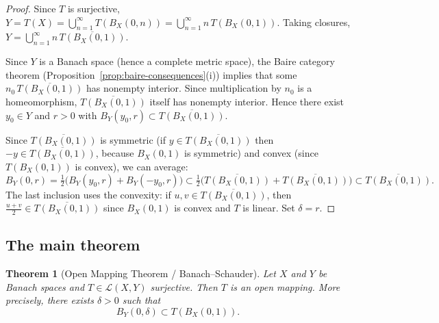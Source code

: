 \documentclass[a4paper,12pt]{book}
\theoremstyle{definition}
\theoremstyle{plain}
\newtheorem{theorem}[definition]{Theorem}
\theoremstyle{remark}
\begin{document}
\begin{proof}
Since $T$ is surjective, $Y = T(X) = \bigcup_{n=1}^{\infty} T(B_X(0,n))
= \bigcup_{n=1}^{\infty} n\, T(B_X(0,1))$. Taking closures,
$Y = \bigcup_{n=1}^{\infty} n\, \overline{T(B_X(0,1))}$.

Since $Y$ is a Banach space (hence a complete metric space), the Baire category
theorem (Proposition~\ref{prop:baire-consequences}(i)) implies that some
$n_0\, \overline{T(B_X(0,1))}$ has nonempty interior. Since multiplication by $n_0$
is a homeomorphism, $\overline{T(B_X(0,1))}$ itself has nonempty interior. Hence
there exist $y_0 \in Y$ and $r > 0$ with $B_Y(y_0, r) \subset
\overline{T(B_X(0,1))}$.

Since $\overline{T(B_X(0,1))}$ is symmetric (if $y \in \overline{T(B_X(0,1))}$ then
$-y \in \overline{T(B_X(0,1))}$, because $B_X(0,1)$ is symmetric) and convex
(since $T(B_X(0,1))$ is convex), we can average:
\[
  B_Y(0, r) = \tfrac{1}{2}\bigl(B_Y(y_0,r) + B_Y(-y_0,r)\bigr)
  \subset \tfrac{1}{2}\bigl(\overline{T(B_X(0,1))} + \overline{T(B_X(0,1))}\bigr)
  \subset \overline{T(B_X(0,1))}.
\]
The last inclusion uses the convexity: if $u, v \in \overline{T(B_X(0,1))}$, then
$\frac{u+v}{2} \in \overline{T(B_X(0,1))}$ since $B_X(0,1)$ is convex and $T$ is
linear. Set $\delta = r$.
\end{proof}

\subsection{The main theorem}

\begin{theorem}[Open Mapping Theorem / Banach--Schauder]\label{thm:omt}
Let $X$ and $Y$ be Banach spaces and $T \in \mathcal{L}(X,Y)$ surjective.
Then $T$ is an open mapping. More precisely, there exists $\delta > 0$ such that
\[
  B_Y(0, \delta) \subset T(B_X(0,1)).
\]
\end{theorem}
\end{document}
